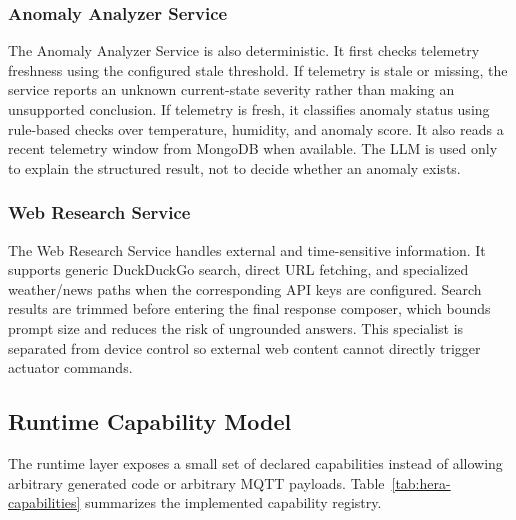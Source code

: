 \subsubsection{Anomaly Analyzer Service}

The Anomaly Analyzer Service is also deterministic. It first checks telemetry freshness using the configured stale threshold. If telemetry is stale or missing, the service reports an unknown current-state severity rather than making an unsupported conclusion. If telemetry is fresh, it classifies anomaly status using rule-based checks over temperature, humidity, and anomaly score. It also reads a recent telemetry window from MongoDB when available. The LLM is used only to explain the structured result, not to decide whether an anomaly exists.

\subsubsection{Web Research Service}

The Web Research Service handles external and time-sensitive information. It supports generic DuckDuckGo search, direct URL fetching, and specialized weather/news paths when the corresponding API keys are configured. Search results are trimmed before entering the final response composer, which bounds prompt size and reduces the risk of ungrounded answers. This specialist is separated from device control so external web content cannot directly trigger actuator commands.

\subsection{Runtime Capability Model}

The runtime layer exposes a small set of declared capabilities instead of allowing arbitrary generated code or arbitrary MQTT payloads. Table~\ref{tab:hera-capabilities} summarizes the implemented capability registry.

